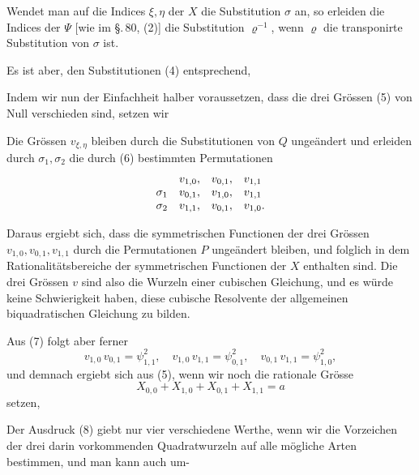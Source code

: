Wendet man auf die Indices $\xi, \eta$ der $X$ die Substitution $\sigma$
an, so erleiden die Indices der $\Psi$ [wie im \S.\,80, (2)] die
Substitution $\varrho^{-1}$, wenn $\varrho$ die transponirte Substitution
von $\sigma$ ist.

Es ist aber, den Substitutionen (4) entsprechend,

Indem wir nun der Einfachheit halber voraussetzen, dass die drei Grössen
(5) von Null verschieden sind, setzen wir

Die Grössen $v_{\xi,\eta}$ bleiben durch die Substitutionen von $Q$
ungeändert und erleiden durch $\sigma_1, \sigma_2$ die durch (6)
bestimmten Permutationen
\[
\begin{array}{l l l l}
 & v_{1,0}, & v_{0,1}, & v_{1,1}\\
\sigma_1 & v_{0,1}, & v_{1,0}, & v_{1,1}\\
\sigma_2 & v_{1,1}, & v_{0,1}, & v_{1,0}.
\end{array}
\]

Daraus ergiebt sich, dass die symmetrischen Functionen der drei Grössen
$v_{1,0}, v_{0,1}, v_{1,1}$ durch die Permutationen $P$ ungeändert
bleiben, und folglich in dem Rationalitätsbereiche der symmetrischen
Functionen der $X$ enthalten sind. Die drei Grössen $v$ sind also die
Wurzeln einer cubischen Gleichung, und es würde keine Schwierigkeit
haben, diese cubische Resolvente der allgemeinen biquadratischen
Gleichung zu bilden.

Aus (7) folgt aber ferner
\[
v_{1,0}\,v_{0,1} = \psi_{1,1}^2, \quad v_{1,0}\,v_{1,1} = \psi_{0,1}^2,
\quad v_{0,1}\,v_{1,1} = \psi_{1,0}^2, %
\]
und demnach ergiebt sich aus (5), wenn wir noch die rationale Grösse
\[
X_{0,0} + X_{1,0} + X_{0,1} + X_{1,1} = a
\]
setzen,

Der Ausdruck (8) giebt nur vier verschiedene Werthe, wenn wir die
Vorzeichen der drei darin vorkommenden Quadratwurzeln auf alle mögliche
Arten bestimmen, und man kann auch um-
